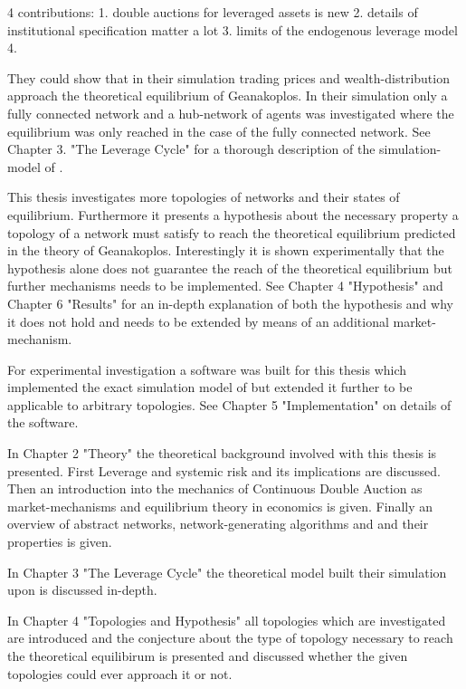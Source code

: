 \documentclass[Bachelorarbeit.tex]{subfiles}
\begin{document}
4 contributions:
1. double auctions for leveraged assets is new
2. details of institutional specification matter a lot
3. limits of the endogenous leverage model
4. 

They could show that in their simulation trading prices and wealth-distribution approach the theoretical equilibrium of Geanakoplos.
In their simulation only a fully connected network and a hub-network of agents was investigated where the equilibrium was only reached in the case of the fully connected network. See Chapter 3. "The Leverage Cycle" for a thorough description of the simulation-model of \cite{Breuer2015}. 

\thinspace

This thesis investigates more topologies of networks and their states of equilibrium. Furthermore it presents a hypothesis about the necessary property a topology of a network must satisfy to reach the theoretical equilibrium predicted in the theory of Geanakoplos. 
Interestingly it is shown experimentally that the hypothesis alone does not guarantee
the reach of the theoretical equilibrium but further mechanisms needs to be implemented.
See Chapter 4 "Hypothesis" and Chapter 6 "Results" for an in-depth explanation of both the hypothesis and why it does not hold and needs to be extended by means of an additional market-mechanism.

\thinspace

For experimental investigation a software was built for this thesis which 
implemented the exact simulation model of \cite{Breuer2015} but extended it further to be 
applicable to arbitrary topologies. See Chapter 5 "Implementation" on details of the software.

\bigskip

In Chapter 2 "Theory" the theoretical background involved with this thesis is presented. First Leverage and systemic risk and its implications are discussed. Then an introduction into the mechanics of Continuous Double Auction as market-mechanisms and equilibrium theory in economics is given. Finally an overview of abstract networks, network-generating algorithms and and their properties is given.

\bigskip

In Chapter 3 "The Leverage Cycle" the theoretical model \cite{Breuer2015} built their simulation upon is discussed in-depth.

\bigskip

In Chapter 4 "Topologies and Hypothesis" all topologies which are investigated are introduced and the conjecture about the type of topology necessary to reach the theoretical equilibirum is presented and discussed whether the given topologies could ever approach it or not.
\end{document}
